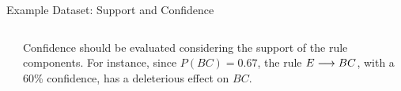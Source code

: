 \begin{frame}[fragile]{Example Dataset: Support and Confidence}
\begin{columns}
\begin{center}
\end{center}
	\begin{minipage}{0.7\textwidth}
        Confidence should be evaluated considering the support of the rule components. For instance, since $P(BC)=0.67$, the rule $E \arule BC$, with a 60\% confidence, has a deleterious effect on $BC$.
	\end{minipage}
\end{columns}

\end{frame}

